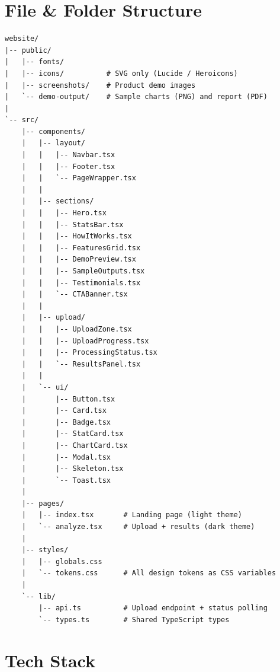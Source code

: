 \documentclass[12pt,a4paper]{article}
\begin{document}
\section{File \& Folder Structure}

\begin{tcolorbox}[recbox, title={Repository Layout}]
\begin{lstlisting}[basicstyle=\small\ttfamily, breaklines=true]
website/
|-- public/
|   |-- fonts/
|   |-- icons/          # SVG only (Lucide / Heroicons)
|   |-- screenshots/    # Product demo images
|   `-- demo-output/    # Sample charts (PNG) and report (PDF)
|
`-- src/
    |-- components/
    |   |-- layout/
    |   |   |-- Navbar.tsx
    |   |   |-- Footer.tsx
    |   |   `-- PageWrapper.tsx
    |   |
    |   |-- sections/
    |   |   |-- Hero.tsx
    |   |   |-- StatsBar.tsx
    |   |   |-- HowItWorks.tsx
    |   |   |-- FeaturesGrid.tsx
    |   |   |-- DemoPreview.tsx
    |   |   |-- SampleOutputs.tsx
    |   |   |-- Testimonials.tsx
    |   |   `-- CTABanner.tsx
    |   |
    |   |-- upload/
    |   |   |-- UploadZone.tsx
    |   |   |-- UploadProgress.tsx
    |   |   |-- ProcessingStatus.tsx
    |   |   `-- ResultsPanel.tsx
    |   |
    |   `-- ui/
    |       |-- Button.tsx
    |       |-- Card.tsx
    |       |-- Badge.tsx
    |       |-- StatCard.tsx
    |       |-- ChartCard.tsx
    |       |-- Modal.tsx
    |       |-- Skeleton.tsx
    |       `-- Toast.tsx
    |
    |-- pages/
    |   |-- index.tsx       # Landing page (light theme)
    |   `-- analyze.tsx     # Upload + results (dark theme)
    |
    |-- styles/
    |   |-- globals.css
    |   `-- tokens.css      # All design tokens as CSS variables
    |
    `-- lib/
        |-- api.ts          # Upload endpoint + status polling
        `-- types.ts        # Shared TypeScript types
\end{lstlisting}
\end{tcolorbox}

\section{Tech Stack}
\end{document}
